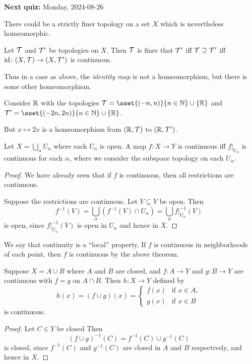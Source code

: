 \textbf{Next quiz:} Monday, 2024-08-26

\begin{remark}[A subtlety]
    There could be a strictly finer topology on a set $X$ which is
    nevertheless homeomorphic.

    Let $\mathcal{T}$ and $\mathcal{T}'$ be topologies on $X$.
    Then $\mathcal{T}$ is finer that $\mathcal{T}'$ iff $\mathcal{T} \supseteq \mathcal{T}'$ iff
    $\operatorname{id}\colon (X, \mathcal{T}) \to (X, \mathcal{T}')$ is continuous.

    Thus in a case as above, the \emph{identity map} is not a homeomorphism,
    but there is some other homeomorphism.
\end{remark}
\begin{example}
    Consider $\mathbb{R}$ with the topologies
    $\T = \sset{(-n, n)}{n \in \N} \cup \set \R$ and
    $\T' = \sset{(-2n, 2n)}{n \in \N} \cup \set \R$.

    But $x \mapsto 2x$ is a homeomorphism from
    $(\mathbb{R}, \mathcal{T})$ to $(\mathbb{R}, \mathcal{T}')$.
\end{example}

\begin{theorem}
    Let $X = \bigcup_\alpha U_\alpha$
    where each $U_\alpha$ is open.
    A map $f\colon X \to Y$ is continuous iff $f\vert_{U_\alpha}$
    is continuous for each $\alpha$,
    where we consider the subspace topology on each $U_\alpha$.
\end{theorem}
\begin{proof}
    We have already seen that if $f$ is continuous, then
    all restrictions are continuous.

    Suppose the restrictions are continuous.
    Let $V \subseteq Y$ be open.
    Then \[
        f^{-1}(V) = \bigcup_\alpha (f^{-1}(V) \cap U_\alpha)
            = \bigcup_\alpha f\vert_{U_\alpha}^{-1}(V)
    \] is open, since $f\vert_{U_\alpha}^{-1}(V)$ is open in $U_\alpha$
    and hence in $X$.
\end{proof}

We say that continuity is a ``local'' property.
If $f$ is continuous in neighborhoods of each point,
then $f$ is continuous by the above theorem.

\begin{theorem} \label{thm:pasting-lemma}
    Suppose $X = A \cup B$ where $A$ and $B$ are closed,
    and $f\colon A \to Y$ and $g\colon B \to Y$ are continuous
    with $f = g$ on $A \cap B$.
    Then $h\colon X \to Y$ defined by \[
        h(x) = (f \cup g)(x) = \begin{cases}
            f(x) & \text{if } x \in A, \\
            g(x) & \text{if } x \in B
        \end{cases}
    \] is continuous.
\end{theorem}
\begin{proof}
    Let $C \in Y$ be closed
    Then \[
        (f \cup g)^{-1}(C) = f^{-1}(C) \cup g^{-1}(C)
    \] is closed, since $f^{-1}(C)$ and $g^{-1}(C)$ are closed
    in $A$ and $B$ respectively, and hence in $X$.
\end{proof}

